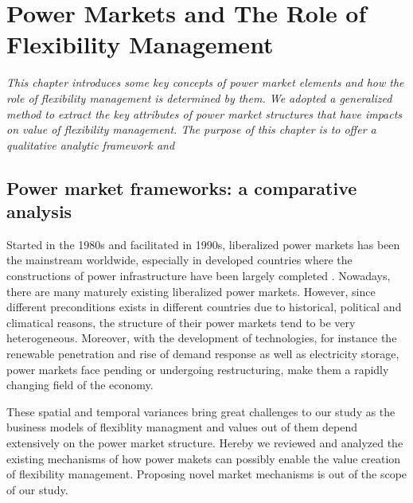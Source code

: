 \chapter{Power Markets and The Role of Flexibility Management}
\label{ch:market}
\textit{This chapter introduces some key concepts of power market elements and how the role of flexibility management is determined by them. We adopted a generalized method to extract the key attributes of power market structures that have impacts on value of flexibility management. The purpose of this chapter is to offer a qualitative analytic framework and}

\section{Power market frameworks: a comparative analysis}

Started in the 1980s and facilitated in 1990s, liberalized power markets has been the mainstream worldwide, especially in developed countries where the constructions of power infrastructure have been largely completed \cite{Srivastava2011,Ranci2013}.
Nowadays, there are many maturely existing liberalized power markets. However, since different preconditions exists in different countries due to historical, political and climatical reasons, the structure of their power markets tend to be very heterogeneous. Moreover, with the development of technologies, for instance the renewable penetration and rise of demand response as well as electricity storage, power markets face pending or undergoing restructuring, make them a rapidly changing field of the economy. \cite{Ziel2015}

These spatial and temporal variances bring great challenges to our study as the business models of flexiblity managment and values out of them depend extensively on the power market structure. Hereby we reviewed and analyzed the existing mechanisms of how power makets can possibly enable the value creation of flexibility management. Proposing novel market mechanisms is out of the scope of our study. 





